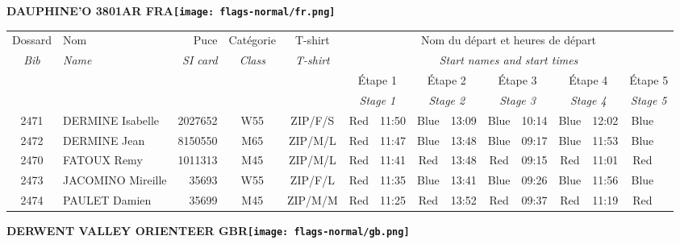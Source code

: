 \documentclass{report}
\begin{document}
\newpage
  \Huge \centering \bfseries DAUPHINE'O 3801AR FRA\normalfont \footnotesize \sffamily \hfill \texttt{[image: flags-normal/fr.png]} \newline 
  \begin{longtable}{|c|l|r|c|c|*{5}{cc|}}
    Dossard & Nom  & Puce    & Catégorie & T-shirt & \multicolumn{10}{c|}{Nom du départ et heures de départ} \\
    \itshape Bib     & \itshape Name & \itshape SI card & \itshape Class  & \itshape  T-shirt  & \multicolumn{10}{c|}{\itshape Start names and start times} \\
    \hline
    & & & & & \multicolumn{2}{c|}{Étape 1} & \multicolumn{2}{c|}{Étape 2} & \multicolumn{2}{c|}{Étape 3} & \multicolumn{2}{c|}{Étape 4} & \multicolumn{2}{c|}{Étape 5} \\
    & & & & & \multicolumn{2}{c|}{\itshape Stage 1} & \multicolumn{2}{c|}{\itshape Stage 2} & \multicolumn{2}{c|}{\itshape Stage 3} & \multicolumn{2}{c|}{\itshape Stage 4} & \multicolumn{2}{c|}{\itshape Stage 5} \\
    \hline
    2471 & DERMINE Isabelle & 2027652 & W55 & ZIP/F/S & Red & 11:50 & Blue & 13:09 & Blue & 10:14 & Blue & 12:02 & Blue &  \\
    2472 & DERMINE Jean & 8150550 & M65 & ZIP/M/L & Red & 11:47 & Blue & 13:48 & Blue & 09:17 & Blue & 11:53 & Blue &  \\
    2470 & FATOUX Remy & 1011313 & M45 & ZIP/M/L & Red & 11:41 & Red & 13:48 & Red & 09:15 & Red & 11:01 & Red &  \\
    2473 & JACOMINO Mireille & 35693 & W55 & ZIP/F/L & Red & 11:35 & Blue & 13:41 & Blue & 09:26 & Blue & 11:56 & Blue &  \\
    2474 & PAULET Damien & 35699 & M45 & ZIP/M/M & Red & 11:25 & Red & 13:52 & Red & 09:37 & Red & 11:19 & Red &  \\
  \end{longtable}
\newpage
  \Huge \centering \bfseries DERWENT VALLEY ORIENTEER  GBR\normalfont \footnotesize \sffamily \hfill \texttt{[image: flags-normal/gb.png]} \newline 
\end{document}
